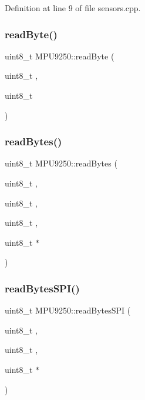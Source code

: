 Definition at line 9 of file sensors.\+cpp.

\mbox{\label{classMPU9250_a846032e6a6d737f4ff62065ca0e1568f}} 
\subsubsection{\texorpdfstring{read\+Byte()}{readByte()}}
{\footnotesize\ttfamily uint8\+\_\+t M\+P\+U9250\+::read\+Byte (\begin{DoxyParamCaption}\item[{uint8\+\_\+t}]{,  }\item[{uint8\+\_\+t}]{ }\end{DoxyParamCaption})}

\mbox{\label{classMPU9250_a083e837c203b46e9af4a5900b731770f}} 
\subsubsection{\texorpdfstring{read\+Bytes()}{readBytes()}}
{\footnotesize\ttfamily uint8\+\_\+t M\+P\+U9250\+::read\+Bytes (\begin{DoxyParamCaption}\item[{uint8\+\_\+t}]{,  }\item[{uint8\+\_\+t}]{,  }\item[{uint8\+\_\+t}]{,  }\item[{uint8\+\_\+t $\ast$}]{ }\end{DoxyParamCaption})}

\mbox{\label{classMPU9250_a9845d64636a0c0eb1a3ba99eb44ebdd4}} 
\subsubsection{\texorpdfstring{read\+Bytes\+S\+P\+I()}{readBytesSPI()}}
{\footnotesize\ttfamily uint8\+\_\+t M\+P\+U9250\+::read\+Bytes\+S\+PI (\begin{DoxyParamCaption}\item[{uint8\+\_\+t}]{,  }\item[{uint8\+\_\+t}]{,  }\item[{uint8\+\_\+t $\ast$}]{ }\end{DoxyParamCaption})}

